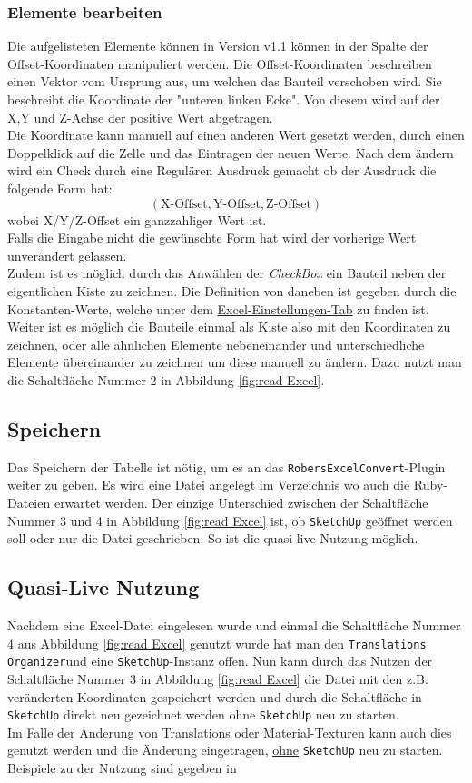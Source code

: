 \documentclass{book}
\newcommand{\sketchup}{\texttt{SketchUp}\xspace}
\newcommand{\robersexcelconvert}{\texttt{RobersExcelConvert}\xspace}
\newcommand{\assisttool}{\texttt{Translations Organizer}}
\begin{document}
			\subsubsection{Elemente bearbeiten}
				Die aufgelisteten Elemente können in Version v1.1 können in der Spalte der Offset-Koordinaten manipuliert werden. Die Offset-Koordinaten beschreiben einen Vektor vom Ursprung aus, um welchen das Bauteil verschoben wird. Sie beschreibt die Koordinate der "unteren linken Ecke". Von diesem wird auf der X,Y und Z-Achse der positive Wert abgetragen.\\
				Die Koordinate kann manuell auf einen anderen Wert gesetzt werden, durch einen Doppelklick auf die Zelle und das Eintragen der neuen Werte. Nach dem ändern wird ein Check durch eine Regulären Ausdruck gemacht ob der Ausdruck die folgende Form hat:
					$$ ( \text{X-Offset}, \text{Y-Offset}, \text{Z-Offset})$$
				wobei X/Y/Z-Offset ein ganzzahliger Wert ist.\\
				Falls die Eingabe nicht die gewünschte Form hat wird der vorherige Wert unverändert gelassen.\\
				Zudem ist es möglich durch das Anwählen der \textit{CheckBox} ein Bauteil neben der eigentlichen Kiste zu zeichnen. Die Definition von \glqq daneben \grqq ist gegeben durch die Konstanten-Werte, welche unter dem \hyperref[excel konstanten]{Excel-Einstellungen-Tab} zu finden ist.\\
				Weiter ist es möglich die Bauteile einmal als Kiste also mit den Koordinaten zu zeichnen, oder alle ähnlichen Elemente nebeneinander und unterschiedliche Elemente übereinander zu zeichnen um diese manuell zu ändern. Dazu nutzt man die Schaltfläche Nummer 2 in Abbildung \ref{fig:read Excel}.
			\subsection{Speichern}
				Das Speichern der Tabelle ist nötig, um es an das \robersexcelconvert-Plugin weiter zu geben. Es wird eine Datei angelegt im Verzeichnis wo auch die Ruby-Dateien erwartet werden. Der einzige Unterschied zwischen der Schaltfläche Nummer 3 und 4 in Abbildung \ref{fig:read Excel} ist, ob \sketchup geöffnet werden soll oder nur die Datei geschrieben. So ist die quasi-live Nutzung möglich. 
			\subsection{Quasi-Live Nutzung}
				Nachdem eine Excel-Datei eingelesen wurde und einmal die Schaltfläche Nummer 4 aus Abbildung \ref{fig:read Excel} genutzt wurde hat man den \assisttool und eine \sketchup-Instanz offen. Nun kann durch das Nutzen der Schaltfläche Nummer 3 in Abbildung \ref{fig:read Excel} die Datei mit den z.B. veränderten Koordinaten gespeichert werden und durch die Schaltfläche in \sketchup direkt neu gezeichnet werden ohne \sketchup neu zu starten.\\
				Im Falle der Änderung von Translations oder Material-Texturen kann auch dies genutzt werden und die Änderung eingetragen, \underline{ohne} \sketchup neu zu starten. Beispiele zu der Nutzung sind gegeben in %
\end{document}
